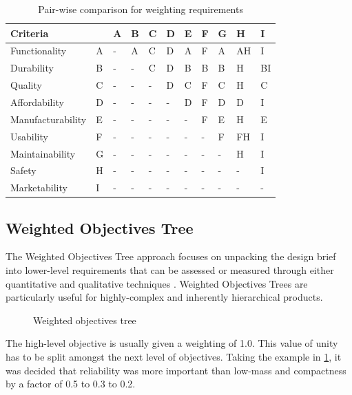 \begin{table}
    \centering
    \caption{Pair-wise comparison for weighting requirements}
    \begin{tabular}{l l | l l l l l l l l l}
        \toprule
        Criteria & & A & B & C & D & E & F & G & H & I \\
        \midrule
        Functionality & A & - & A & C & D & A & F & A & AH & I \\
        Durability & B & - & - & C & D & B & B & B & H & BI \\
        Quality & C & - & - & - & D & C & F & C & H & C \\
        Affordability & D & - & - & - & - & D & F & D & D & I \\
        Manufacturability & E & - & - & - & - & - & F & E & H & E \\
        Usability & F & - & - & - & - & - & - & F & FH & I \\
        Maintainability & G & - & - & - & - & - & - & - & H & I \\
        Safety & H & - & - & - & - & - & - & - & - & I \\
        Marketability & I & - & - & - & - & - & - & - & - & - \\
        \bottomrule
    \end{tabular}
\end{table}

\subsection{Weighted Objectives Tree}

The Weighted Objectives Tree approach focuses on unpacking the design brief into lower-level requirements that can be assessed or measured through either quantitative and qualitative techniques . 
Weighted Objectives Trees are particularly useful for highly-complex and inherently hierarchical products.

\begin{figure}[h!]
    \centering
    
    \vspace{1em}
    \caption{Weighted objectives tree}
    \label{fig-wot}
\end{figure}

The high-level objective is usually given a weighting of 1.0.
This value of unity has to be split amongst the next level of objectives.
Taking the example in \cref{fig-wot}, it was decided that reliability was more important than low-mass and compactness by a factor of 0.5 to 0.3 to 0.2.

